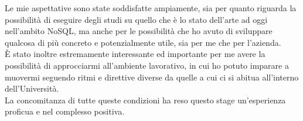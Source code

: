 \noindent Le mie aspettative sono state soddisfatte ampiamente, sia per quanto riguarda la possibilità di eseguire degli studi su quello che è lo stato dell'arte ad oggi nell'ambito NoSQL, ma anche per le possibilità che ho avuto di sviluppare qualcosa di più concreto e potenzialmente utile, sia per me che per l'azienda.\\

\noindent È stato inoltre estremamente interessante ed importante per me avere la possibilità di approcciarmi all'ambiente lavorativo, in cui ho potuto imparare a muovermi seguendo ritmi e direttive diverse da quelle a cui ci si abitua all'interno dell'Università.\\

\noindent La concomitanza di tutte queste condizioni ha reso questo stage un'esperienza proficua e nel complesso positiva.\\
